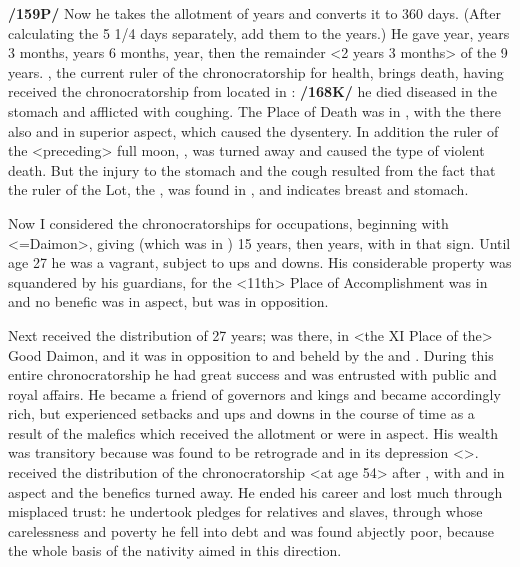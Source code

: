 \textbf{/159P/} Now he takes the allotment of years and converts it to 360 days. (After calculating the 5 1/4 days separately, add them to the years.) He gave \Sagittarius\xspace 1 year, \Capricorn\xspace 2 years 3 months, \Aquarius\xspace 2 years 6 months, \Pisces\xspace 1 year, then \Aries\xspace the remainder <2 years 3 months> of the 9 years. \Mars, the current ruler of the chronocratorship for health, brings death, having received the chronocratorship from \Saturn\xspace located in \Sagittarius: \textbf{/168K/} he died diseased in the stomach and afflicted with coughing. The Place of Death was in \Pisces, with the \Moon\xspace there also and \Saturn\xspace in superior aspect, which caused the dysentery. In addition the ruler of the <preceding> full moon, \Saturn, was turned away and caused the type of violent death. But the injury to the stomach and the cough resulted from the fact that the ruler of the Lot, the \Sun, was found in \Cancer, and \Cancer\xspace indicates breast and stomach.

Now I considered the chronocratorships for occupations, beginning with \Scorpio\xspace <=Daimon>, giving \Mars\xspace (which was in \Scorpio) 15 years, then \Sagittarius\xspace 12 years, with \Saturn\xspace in that sign. Until age 27 he was a vagrant, subject to ups and downs. His considerable property was squandered by his guardians, for
the <11th> Place of Accomplishment was in \Gemini\xspace and no benefic was in aspect, but \Saturn\xspace was in
opposition. 

Next \Capricorn\xspace received the distribution of 27 years; \Jupiter\xspace was there, in <the XI Place of the> Good Daimon, and it was in opposition to and beheld by the \Sun\xspace and \Venus. During this entire chronocratorship he had great success and was entrusted with public and royal affairs. He became a friend of governors and kings and became accordingly rich, but experienced setbacks and ups and downs in the course of time as a result of the malefics which received the allotment or were in aspect. His wealth was transitory because \Jupiter\xspace was found to be retrograde and in its depression <\Capricorn>. \Aquarius\xspace received
the distribution of the chronocratorship <at age 54> after \Capricorn, with \Mars\xspace and \Mercury\xspace in aspect and
the benefics turned away. He ended his career and lost much through misplaced trust: he undertook pledges for relatives and slaves, through whose carelessness and poverty he fell into debt and was found abjectly poor, because the whole basis of the nativity aimed in this direction. 

